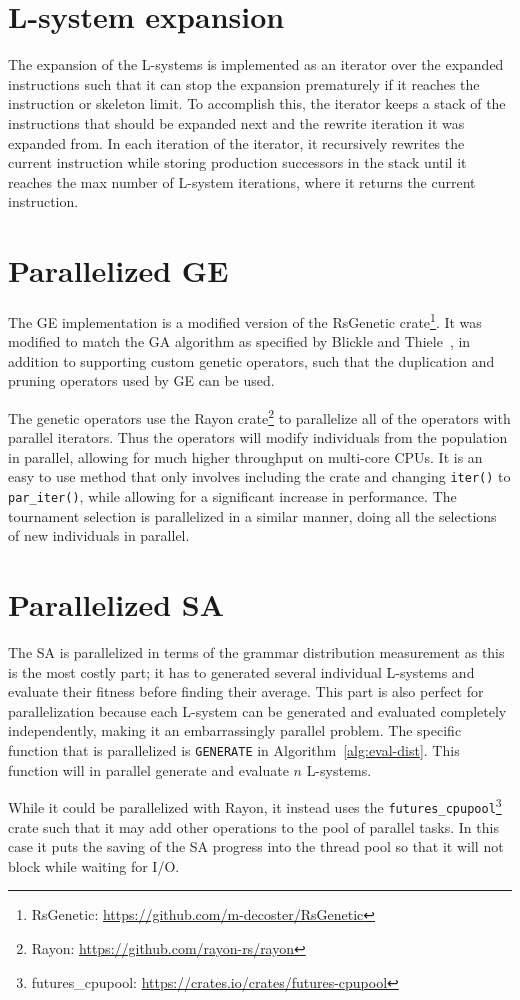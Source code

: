 \section{L-system expansion}
The expansion of the \glspl{L-system} is implemented as an iterator over the expanded instructions such that it can stop the expansion prematurely if it reaches the instruction or skeleton limit.
To accomplish this, the iterator keeps a stack of the instructions that should be expanded next and the rewrite iteration it was expanded from.
In each iteration of the iterator, it recursively rewrites the current instruction while storing production successors in the stack until it reaches the max number of \gls{L-system} iterations, where it returns the current instruction.

\section[Parallelized GE]{Parallelized \gls{GE}}
The \gls{GE} implementation is a modified version of the RsGenetic crate\footnote{RsGenetic: \url{https://github.com/m-decoster/RsGenetic}}.
It was modified to match the \gls{GA} algorithm as specified by Blickle and Thiele~\cite{1995Blickle}, in addition to supporting custom genetic operators, such that the duplication and pruning operators used by \gls{GE} can be used.

The genetic operators use the Rayon crate\footnote{Rayon: \url{https://github.com/rayon-rs/rayon}} to parallelize all of the operators with parallel iterators.
Thus the operators will modify individuals from the population in parallel, allowing for much higher throughput on multi-core CPUs.
It is an easy to use method that only involves including the crate and changing \texttt{iter()} to \texttt{par\_iter()}, while allowing for a significant increase in performance.
The tournament selection is parallelized in a similar manner, doing all the selections of new individuals in parallel.

\section[Parallelized SA]{Parallelized \gls{SA}}
The \gls{SA} is parallelized in terms of the grammar distribution measurement as this is the most costly part; it has to generated several individual \glspl{L-system} and evaluate their fitness before finding their average.
This part is also perfect for parallelization because each \gls{L-system} can be generated and evaluated completely independently, making it an embarrassingly parallel problem.
The specific function that is parallelized is \texttt{GENERATE} in Algorithm~\ref{alg:eval-dist}.
This function will in parallel generate and evaluate $n$ \glspl{L-system}.

While it could be parallelized with Rayon, it instead uses the \texttt{futures\_cpupool}\footnote{futures\_cpupool: \url{https://crates.io/crates/futures-cpupool}} crate such that it may add other operations to the pool of parallel tasks.
In this case it puts the saving of the \gls{SA} progress into the thread pool so that it will not block while waiting for I/O.
